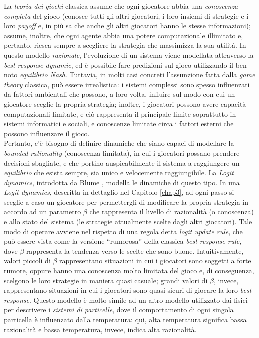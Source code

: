 La \textit{teoria dei giochi} classica assume che ogni giocatore abbia una \textit{conoscenza completa} del gioco (conosce tutti gli altri giocatori, i loro insiemi di strategie e i loro \textit{payoff} e, in più sa che anche gli altri giocatori hanno le stesse informazioni); assume, inoltre, che ogni agente abbia una potere computazionale illimitato e, pertanto, riesca sempre a scegliere la strategia che massimizza la sua utilità. In questo modello \textit{razionale}, l’evoluzione di un sistema viene modellata attraverso la \textit{best response dynamic}, ed è possibile fare predizioni sul gioco utilizzando il ben noto \textit{equilibrio Nash}. Tuttavia, in molti casi concreti l’assunzione fatta dalla \textit{game theory} classica, può essere irrealistica: i sistemi complessi sono spesso influenzati da fattori ambientali che possono, a loro volta, influire sul modo con cui un giocatore sceglie la propria strategia; inoltre, i giocatori possono avere capacità computazionali limitate, e ciò rappresenta il principale limite soprattutto in sistemi informatici e sociali, e conoscenze limitate circa i fattori esterni che possono influenzare il gioco.\\
Pertanto, c’è bisogno di definire dinamiche che siano capaci di modellare la \textit{bounded rationality} (conoscenza limitata), in cui i giocatori possano prendere decisioni sbagliate, e che portino auspicabilmente il sistema a raggiungere un \textit{equilibrio} che esista sempre, sia unico e velocemente raggiungibile. La \textit{Logit dynamics}, introdotta da Blume \cite{blume1993statistical}, modella le dinamiche di questo tipo. In una \textit{Logit dynamics}, descritta in dettaglio nel Capitolo \ref{chap3}, ad ogni passo si sceglie a caso un giocatore per permettergli di modificare la propria strategia in accordo ad un parametro $\beta$ che rappresenta il livello di razionalità (o conoscenza) e allo stato del sistema (le strategie attualmente scelte dagli altri giocatori). Tale modo di operare avviene nel rispetto di una regola detta \textit{logit update rule}, che può essere vista come la versione ``rumorosa'' della classica \textit{best response rule}, dove $\beta$ rappresenta la tendenza verso le scelte che sono buone. Intuitivamente, valori piccoli di $\beta$ rappresentano situazioni in cui i giocatori sono soggetti a forte rumore, oppure hanno una conoscenza molto limitata del gioco e, di conseguenza, scelgono le loro strategie in maniera quasi casuale; grandi valori di $\beta$, invece, rappresentano situazioni in cui i giocatori sono quasi sicuri di giocare la loro \textit{best response}. Questo modello è molto simile ad un altro modello utilizzato dai fisici per descrivere i \textit{sistemi di particelle}, dove il comportamento di ogni singola particella è influenzato dalla temperatura: qui, alta temperatura significa bassa razionalità e bassa temperatura, invece, indica alta razionalità.\\
